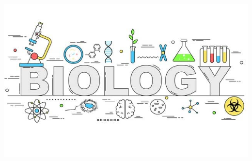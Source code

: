 \documentclass[10pt]{beamer}
\begin{document}
\begin{frame}[t]
\begin{columns}
		\begin{column}{0.33\textwidth}
			\begin{center}
				\includegraphics[width=1.0\textwidth]{figures/biology2.jpg}
			\end{center}
		\end{column}
	\end{columns}
\end{frame}
\end{document}
